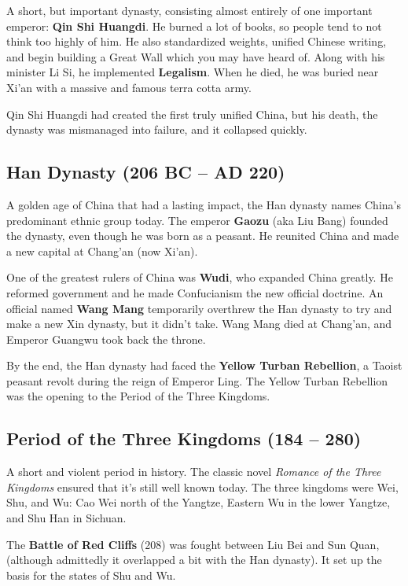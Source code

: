 A short, but important dynasty,
consisting almost entirely of one important emperor: \textbf{Qin Shi Huangdi}.
He burned a lot of books, so people tend to not think too highly of him.
He also standardized weights, unified Chinese writing,
and begin building a Great Wall which you may have heard of.
Along with his minister Li Si, he implemented \textbf{Legalism}.
When he died, he was buried near Xi'an with a massive and famous terra cotta army.

Qin Shi Huangdi had created the first truly unified China,
but his death, the dynasty was mismanaged into failure, and it collapsed quickly.

\subsection*{Han Dynasty (206 BC -- AD 220)}

A golden age of China that had a lasting impact,
the Han dynasty names China's predominant ethnic group today.
The emperor \textbf{Gaozu} (aka Liu Bang) founded the dynasty, even though he was born as a peasant.
He reunited China and made a new capital at Chang'an (now Xi'an).

One of the greatest rulers of China was \textbf{Wudi}, who expanded China greatly.
He reformed government and he made Confucianism the new official doctrine.
An official named \textbf{Wang Mang} temporarily overthrew the Han dynasty
to try and make a new Xin dynasty, but it didn't take.
Wang Mang died at Chang'an, and Emperor Guangwu took back the throne.

By the end, the Han dynasty had faced the \textbf{Yellow Turban Rebellion},
a Taoist peasant revolt during the reign of Emperor Ling.
The Yellow Turban Rebellion was the opening to the Period of the Three Kingdoms.

\subsection*{Period of the Three Kingdoms (184 -- 280)}

A short and violent period in history.
The classic novel \textit{Romance of the Three Kingdoms} ensured that it's still well known today.
The three kingdoms were Wei, Shu, and Wu:
Cao Wei north of the Yangtze,
Eastern Wu in the lower Yangtze,
and Shu Han in Sichuan.

The \textbf{Battle of Red Cliffs} (208) was fought between Liu Bei and Sun Quan,
(although admittedly it overlapped a bit with the Han dynasty).
It set up the basis for the states of Shu and Wu.

